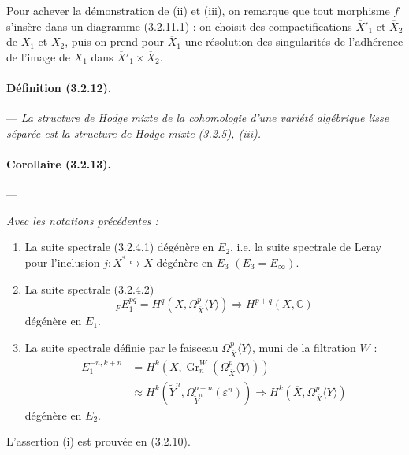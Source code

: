 \documentclass[10pt]{article}
\newcommand{\C}{\mathbb C}
\newcommand{\Gr}{\operatorname{Gr}}
\begin{document}
Pour achever la démonstration de (ii) et (iii), on remarque que tout morphisme $f$ s'insère dans un diagramme (3.2.11.1) : on choisit des compactifications $\overline X'_1$ et $\overline X_2$ de $X_1$ et $X_2$, puis on prend pour $\overline X_1$ une résolution des singularités de l'adhérence de l'image de $X_1$ dans $\overline X'_1\times\overline X_2$.

\paragraph{Définition (3.2.12).} --- {\itshape La structure de Hodge mixte de la cohomologie d'une variété algébrique lisse séparée est la structure de Hodge mixte (3.2.5), (iii).}

\paragraph{Corollaire (3.2.13).} --- {\itshape Avec les notations précédentes :
\begin{enumerate}[label=(\roman*)]
\item La suite spectrale (3.2.4.1) dégénère en $E_2$, i.e. la suite spectrale de Leray pour l'inclusion $j:X^*\hookrightarrow\overline X$ dégénère en $E_3$ $(E_3=E_\infty)$.
\item La suite spectrale (3.2.4.2)
\[
{}_F E_1^{pq}=H^q(\overline X,\Omega_{\overline X}^p\langle Y\rangle)
\Longrightarrow H^{p+q}(X,\C)
\]
dégénère en $E_1$.
\item La suite spectrale définie par le faisceau $\Omega_{\overline X}^{p}\langle Y\rangle$, muni de la filtration $W$ :
\[
\begin{aligned}
E_1^{-n,k+n}
&=H^k(\overline X,\Gr_n^W(\Omega_{\overline X}^{p}\langle Y\rangle))\\
&\approx H^k(\widetilde Y^n,\Omega_{\widetilde Y^n}^{p-n}(\varepsilon^n))
\Longrightarrow H^k(\overline X,\Omega_{\overline X}^{p}\langle Y\rangle)
\end{aligned}
\]
dégénère en $E_2$.
\end{enumerate}}

L'assertion (i) est prouvée en (3.2.10).
\end{document}
